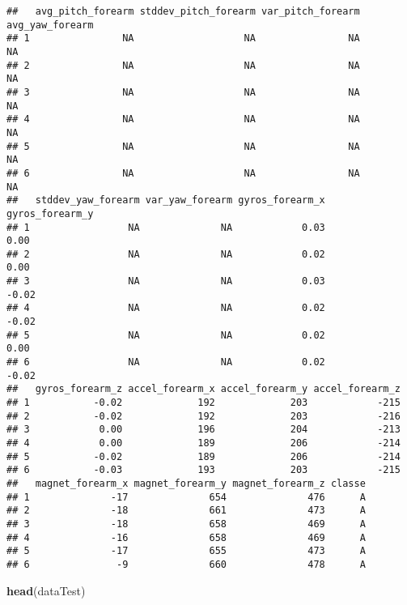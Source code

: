 \documentclass[]{article}
\newenvironment{Shaded}{\begin{snugshade}}{\end{snugshade}}
\newcommand{\KeywordTok}[1]{\textcolor[rgb]{0.13,0.29,0.53}{\textbf{#1}}}
\newcommand{\NormalTok}[1]{#1}
\begin{document}
\begin{verbatim}
##   avg_pitch_forearm stddev_pitch_forearm var_pitch_forearm avg_yaw_forearm
## 1                NA                   NA                NA              NA
## 2                NA                   NA                NA              NA
## 3                NA                   NA                NA              NA
## 4                NA                   NA                NA              NA
## 5                NA                   NA                NA              NA
## 6                NA                   NA                NA              NA
##   stddev_yaw_forearm var_yaw_forearm gyros_forearm_x gyros_forearm_y
## 1                 NA              NA            0.03            0.00
## 2                 NA              NA            0.02            0.00
## 3                 NA              NA            0.03           -0.02
## 4                 NA              NA            0.02           -0.02
## 5                 NA              NA            0.02            0.00
## 6                 NA              NA            0.02           -0.02
##   gyros_forearm_z accel_forearm_x accel_forearm_y accel_forearm_z
## 1           -0.02             192             203            -215
## 2           -0.02             192             203            -216
## 3            0.00             196             204            -213
## 4            0.00             189             206            -214
## 5           -0.02             189             206            -214
## 6           -0.03             193             203            -215
##   magnet_forearm_x magnet_forearm_y magnet_forearm_z classe
## 1              -17              654              476      A
## 2              -18              661              473      A
## 3              -18              658              469      A
## 4              -16              658              469      A
## 5              -17              655              473      A
## 6               -9              660              478      A
\end{verbatim}

\begin{Shaded}
\begin{Highlighting}[]
\KeywordTok{head}\NormalTok{(dataTest)}
\end{Highlighting}
\end{Shaded}
\end{document}
